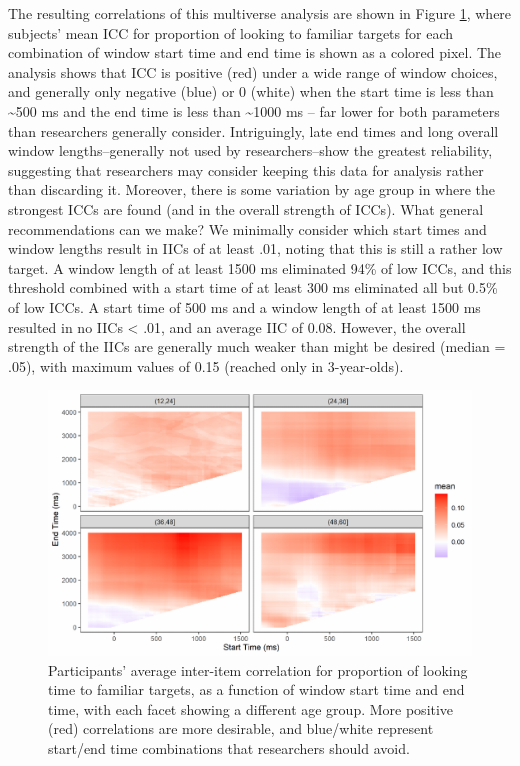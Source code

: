 \documentclass[10pt, letterpaper]{article}
\newenvironment{CodeChunk}{}{}
\begin{document}
The resulting correlations of this multiverse analysis are shown in
Figure \ref{fig:time_window}, where subjects' mean ICC for proportion of
looking to familiar targets for each combination of window start time
and end time is shown as a colored pixel. The analysis shows that ICC is
positive (red) under a wide range of window choices, and generally only
negative (blue) or 0 (white) when the start time is less than
\textasciitilde500 ms and the end time is less than \textasciitilde1000
ms -- far lower for both parameters than researchers generally consider.
Intriguingly, late end times and long overall window lengths--generally
not used by researchers--show the greatest reliability, suggesting that
researchers may consider keeping this data for analysis rather than
discarding it. Moreover, there is some variation by age group in where
the strongest ICCs are found (and in the overall strength of ICCs). What
general recommendations can we make? We minimally consider which start
times and window lengths result in IICs of at least .01, noting that
this is still a rather low target. A window length of at least 1500 ms
eliminated 94\% of low ICCs, and this threshold combined with a start
time of at least 300 ms eliminated all but 0.5\% of low ICCs. A start
time of 500 ms and a window length of at least 1500 ms resulted in no
IICs \textless{} .01, and an average IIC of 0.08. However, the overall
strength of the IICs are generally much weaker than might be desired
(median = .05), with maximum values of 0.15 (reached only in
3-year-olds).

\begin{CodeChunk}
\begin{figure}[h]

{\centering \includegraphics{figs/time_window-1} 

}

\caption[Participants' average inter-item correlation for proportion of looking time to familiar targets, as a function of window start time and end time, with each facet showing a different age group]{Participants' average inter-item correlation for proportion of looking time to familiar targets, as a function of window start time and end time, with each facet showing a different age group. More positive (red) correlations are more desirable, and blue/white represent start/end time combinations that researchers should avoid.}\label{fig:time_window}
\end{figure}
\end{CodeChunk}
\end{document}
